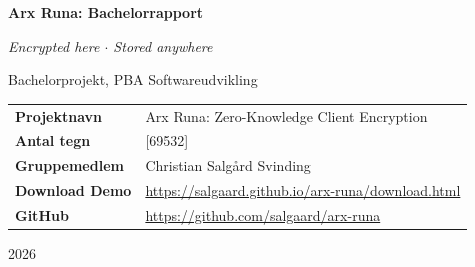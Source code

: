 \begin{titlepage}
\centering
\vspace*{3cm}

{\LARGE\bfseries Arx Runa: Bachelorrapport\par}
\vspace{0.8cm}
{\large\itshape Encrypted here $\cdot$ Stored anywhere\par}
\vspace{0.3cm}
{\large Bachelorprojekt, PBA Softwareudvikling\par}

\vspace{3cm}

\begin{tabular}{@{}ll@{}}
\textbf{Projektnavn}     & Arx Runa: Zero-Knowledge Client Encryption \\[0.5em]
\textbf{Antal tegn}      & {[69532]} \\[0.5em]
\textbf{Gruppemedlem}    & Christian Salgård Svinding \\[0.5em]
\textbf{Download Demo}     & \url{https://salgaard.github.io/arx-runa/download.html} \\[0.5em]
\textbf{GitHub}          & \url{https://github.com/salgaard/arx-runa} \\[0.5em]
\end{tabular}

\vfill
{\large 2026\par}
\end{titlepage}
